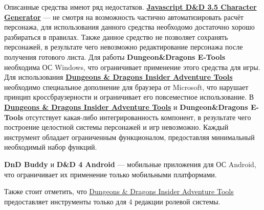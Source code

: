 Описанные средства имеют ряд недостатков.
\textbf{\href{http://www.pathguy.com/cg35.htm}{Javascript D\&D 3.5 Character Generator}} --- не смотря на возможность частично автоматизировать расчёт персонажа, для использования данного средства необходомо достаточно хорошо разбираться в правилах. Также данное средство не позволяет сохранять персонажей, в результате чего невозможно редактирование персонажа после получения готового листа.
Для работы \textbf{Dungeon\&Dragons E-Tools} необходима ОС Windows, что ограничивает применение этого средства для игры.
Для использования \textbf{\href{http://www.wizards.com/dnd/Tool.aspx?x=dnd/4new/tool/adventuretools}{Dungeons \& Dragons Insider Adventure Tools}} необходимо специальное дополнение для браузера от Microsoft, что нарушает принцип кроссбраузерности и ограничивает его повсеместное использование.
В \textbf{\href{http://www.wizards.com/dnd/Tool.aspx?x=dnd/4new/tool/adventuretools}{Dungeons \& Dragons Insider Adventure Tools}} и \textbf{Dungeon\&Dragons E-Tools} отсутствует какая-либо интегрированность компонент, в результате чего построение целостной системы персонажей и игр невозможно. Каждый инструмент обладает ограниченным функционалом, предоставляя минимальный необходимый набор функций.

\textbf{DnD Buddy} и \textbf{D\&D 4 Android} --- мобильные приложения для ОС Android, что ограничивает их применение только мобильными платформами.

Также стоит отметить, что \href{http://www.wizards.com/dnd/Tool.aspx?x=dnd/4new/tool/adventuretools}{Dungeons \& Dragons Insider Adventure Tools} предоставляет инструменты только для 4 редакции ролевой системы.
